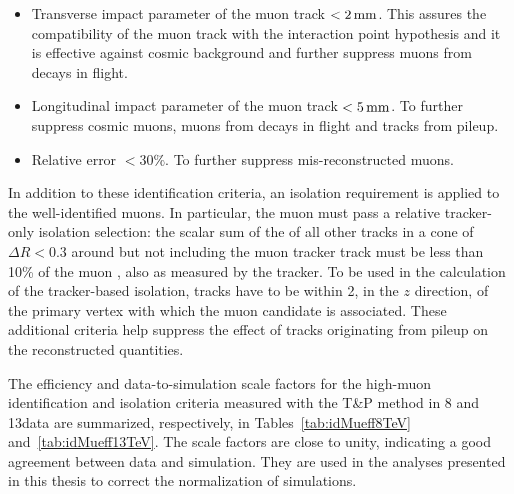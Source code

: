 \begin{itemize}
\item Transverse impact parameter of the muon track $< 2\,\text{mm}$. This assures the compatibility of the muon track with the interaction point hypothesis and it is effective against cosmic background and further suppress muons from decays in flight.
\item Longitudinal impact parameter of the muon track $< 5\,\text{mm}$. To further suppress cosmic muons, muons from decays in flight and tracks from pileup.
\item Relative \pt error $< 30\%$. To further suppress mis-reconstructed muons.
\end{itemize}

In addition to these identification criteria, an isolation requirement is applied to the well-identified muons. In particular, the muon must pass a relative tracker-only isolation selection: the scalar sum of the \pt of all other tracks in a cone of  $\Delta R < 0.3$ around but not including the muon tracker track must be less than 10\% of the muon \pt, also as measured by the tracker. To be used in the calculation of the tracker-based isolation, tracks have to be within 2\mm, in the $z$ direction, of the primary vertex with which the muon candidate is associated. These additional criteria help suppress the effect of tracks originating from pileup on the reconstructed quantities.

The efficiency and data-to-simulation scale factors for the high-\pt muon identification and isolation criteria measured with the T\&P method in 8 and 13\TeV data are summarized, respectively, in Tables~\ref{tab:idMueff8TeV} and~\ref{tab:idMueff13TeV}. The scale factors are close to unity, indicating a good agreement between data and simulation. They are used in the analyses presented in this thesis to correct the normalization of simulations.

